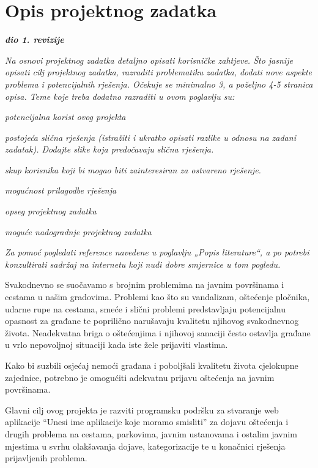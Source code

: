 \chapter{Opis projektnog zadatka}


\textbf{\textit{dio 1. revizije}}\\

{\color{red}\textit{Na osnovi projektnog zadatka detaljno opisati korisničke zahtjeve. Što jasnije opisati cilj projektnog zadatka, razraditi problematiku zadatka, dodati nove aspekte problema i potencijalnih rješenja. Očekuje se minimalno 3, a poželjno 4-5 stranica opisa.	Teme koje treba dodatno razraditi u ovom poglavlju su:}
\begin{packed_item}
	\item \textit{potencijalna korist ovog projekta}
	\item \textit{postojeća slična rješenja (istražiti i ukratko opisati razlike u odnosu na zadani zadatak). Dodajte slike koja predočavaju slična rješenja.}
	\item \textit{skup korisnika koji bi mogao biti zainteresiran za ostvareno rješenje.}
	\item \textit{mogućnost prilagodbe rješenja }
	\item \textit{opseg projektnog zadatka}
	\item \textit{moguće nadogradnje projektnog zadatka}
\end{packed_item}

\textit{Za pomoć pogledati reference navedene u poglavlju „Popis literature“, a po potrebi konzultirati sadržaj na internetu koji nudi dobre smjernice u tom pogledu.}
\eject
}

Svakodnevno se suočavamo s brojnim problemima na javnim površinama i cestama u našim gradovima. Problemi kao što su vandalizam, oštećenje pločnika, udarne rupe na cestama, smeće i slični problemi predstavljaju potencijalnu opasnost za građane te poprilično narušavaju kvalitetu njihovog svakodnevnog života. Neadekvatna briga o oštećenjima i njihovoj sanaciji često ostavlja građane u vrlo nepovoljnoj situaciji kada iste žele prijaviti vlastima.

Kako bi suzbili osjećaj nemoći građana i poboljšali kvalitetu života cjelokupne zajednice, potrebno je omogućiti adekvatnu prijavu oštećenja na javnim površinama.

Glavni cilj ovog projekta je razviti programsku podršku za stvaranje web aplikacije “Unesi ime aplikacije koje moramo smisliti” za dojavu oštećenja i drugih problema na cestama, parkovima, javnim ustanovama i ostalim javnim mjestima u svrhu olakšavanja dojave, kategorizacije te u konačnici rješenja prijavljenih problema.

